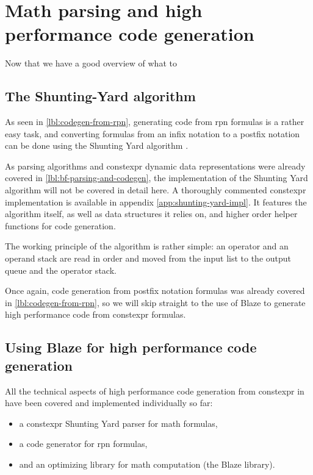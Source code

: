 \documentclass[../main]{subfiles}
\begin{document}

\section{
  Math parsing and high performance code generation
}

Now that we have a good overview of what to

\subsection{
  The Shunting-Yard algorithm
}

As seen in \ref{lbl:codegen-from-rpn}, generating code from \gls{rpn} formulas
is a rather easy task, and converting formulas from an infix notation to a
postfix notation can be done using the Shunting Yard
algorithm \cite{shunting-yard}.

As parsing algorithms and \gls{constexpr} dynamic data representations were
already covered in \ref{lbl:bf-parsing-and-codegen}, the implementation of
the Shunting Yard algorithm will not be covered in detail here.
A thoroughly commented \gls{constexpr} implementation is available in appendix
\ref{app:shunting-yard-impl}. It features the algorithm itself, as well as
data structures it relies on, and higher order helper functions
for code generation.

The working principle of the algorithm is rather simple:
an operator and an operand stack are read in order and moved
from the input list to the output queue and the operator stack.


Once again, code generation from postfix notation formulas was already covered
in \ref{lbl:codegen-from-rpn}, so we will skip straight to the use of Blaze
to generate high performance code from \gls{constexpr} formulas.

\subsection{
  Using Blaze for high performance code generation
}

All the technical aspects of high performance code generation from
\gls{constexpr}  in  have been covered and implemented
individually so far:

\begin{itemize}
\item a \gls{constexpr} Shunting Yard parser for math formulas,
\item a code generator for \gls{rpn} formulas,
\item and an optimizing library for math computation (the Blaze library).
\end{itemize}
\end{document}
